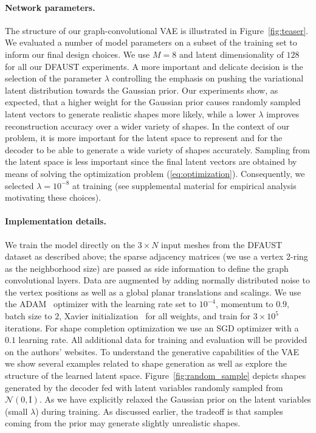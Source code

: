 \documentclass[10pt,twocolumn,letterpaper]{article}
\newcommand{\bb}[1]{\bm{\mathrm{#1}}}
\begin{document}
\paragraph{Network parameters.} 
The structure of our graph-convolutional VAE is illustrated in Figure~\ref{fig:teaser}. We evaluated a number of model parameters on a subset of the training set to inform our final design choices. We use $M=8$ and latent dimensionality of $128$ for all our DFAUST experiments.  
A more important and delicate decision is the selection of the parameter $\lambda$ controlling the emphasis on pushing the variational latent distribution towards the Gaussian prior. Our experiments show, as expected, that a higher weight for the Gaussian prior causes randomly sampled latent vectors to generate realistic shapes more likely, while a lower $\lambda$ improves reconstruction accuracy over a wider variety of shapes. In the context of our problem, it is more important for the latent space to represent and for the decoder to be able to generate a wide variety of shapes accurately. Sampling from the latent space is less important since the final latent vectors are obtained by means of solving the optimization problem (\ref{eq:optimization}). Consequently, we selected $\lambda = 10^{-8}$ at training (see supplemental material for empirical analysis motivating these choices).

\paragraph{Implementation details.}
We train the model directly on the $3 \times N$ input meshes from the DFAUST dataset as described above; the sparse adjacency matrices (we use a vertex 2-ring as the neighborhood size) are passed as side information to define the graph convolutional layers. Data are augmented by adding normally distributed noise to the vertex positions as well as a global planar translations and scalings. We use the ADAM~\cite{kingma2014adam} optimizer with the learning rate set to $10^{-4}$, momentum to $0.9$, batch size to $2$, Xavier initialization~\cite{xavierInit} for all weights, and train for $3 \times 10^5$ iterations. For shape completion optimization we use an SGD optimizer with a $0.1$ learning rate. All additional data for training and evaluation will be provided on the authors' websites.
To understand the generative capabilities of the VAE we show several examples related to shape generation as well as explore the structure of the learned latent space.
Figure~\ref{fig:random_sample} depicts shapes generated by the decoder fed with latent variables randomly sampled from $\mathcal{N}(\bb{0},\bb{I})$. As we have explicitly relaxed the Gaussian prior on the latent variables (small $\lambda$) during training. As discussed earlier, the tradeoff is that samples coming from the prior may generate slightly unrealistic shapes.
\end{document}
